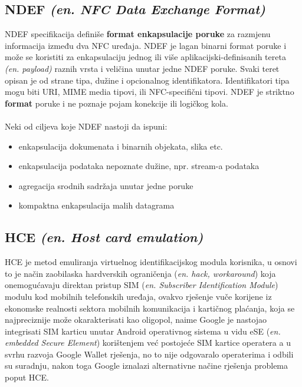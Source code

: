 \subsection{NDEF \textit{(en. NFC Data Exchange Format)}}
NDEF specifikacija definiše \textbf{format enkapsulacije poruke} za razmjenu informacija između dva NFC uređaja. NDEF je lagan binarni format poruke i može se koristiti za enkapsulaciju jednog ili više aplikacijski-definisanih tereta \textit{(en. payload)} raznih vrsta i veličina unutar jedne NDEF poruke. Svaki teret opisan je od strane tipa, dužine i opcionalnog identifikatora. Identifikatori tipa mogu biti URI, MIME media tipovi, ili NFC-specifični tipovi. NDEF je striktno \textbf{format} poruke i ne poznaje pojam konekcije ili logičkog kola.\cite{NDEF}

\paragraph*{}
Neki od ciljeva koje NDEF nastoji da ispuni:
\begin{itemize}[noitemsep]
    \item enkapsulacija dokumenata i binarnih objekata, slika etc.
    \item enkapsulacija podataka nepoznate dužine, npr. stream-a podataka
    \item agregacija srodnih sadržaja unutar jedne poruke
    \item kompaktna enkapsulacija malih datagrama
\end{itemize}

\subsection{HCE \textit{(en. Host card emulation)}}
HCE je metod emuliranja virtuelnog identifikacijskog modula korisnika, u osnovi to je način zaobilaska hardverskih ograničenja (\textit{en. hack, workaround}) koja onemogućavaju direktan pristup SIM (\textit{en. Subscriber Identification Module}) modulu kod mobilnih telefonskih uređaja\cite{elenkov_2012}, ovakvo rješenje vuče korijene iz ekonomske realnosti sektora mobilnih komunikacija i kartičnog plaćanja, koja se najpreciznije može okarakterisati kao oligopol, naime Google je nastojao integrisati SIM karticu unutar Android operativnog sistema u vidu eSE (\textit{en. embedded Secure Element}) korištenjem već postojeće SIM kartice operatera a u svrhu razvoja Google Wallet rješenja, no to nije odgovaralo operaterima i odbili su suradnju, nakon toga Google iznalazi alternativne načine rješenja problema poput HCE\cite{randomoracle_2014}.

